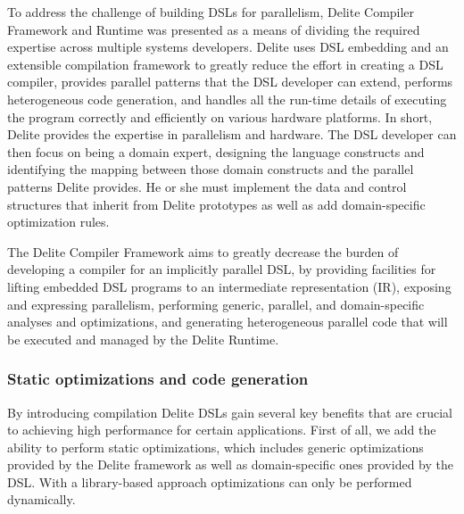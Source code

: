To address the challenge of building DSLs for parallelism,
 Delite Compiler Framework and Runtime was presented as
a means of dividing the required expertise across multiple
systems developers. Delite uses DSL embedding and an extensible compilation
 framework to greatly reduce the effort
in creating a DSL compiler, provides parallel patterns that
the DSL developer can extend, performs heterogeneous code
generation, and handles all the run-time details of executing
the program correctly and efficiently on various hardware
platforms. In short, Delite provides the expertise in parallelism
and hardware. The DSL developer can then focus on being a
domain expert, designing the language constructs and identifying the mapping 
between those domain constructs and the
parallel patterns Delite provides. He or she must implement the
data and control structures that inherit from Delite prototypes
as well as add domain-specific optimization rules.

The Delite Compiler Framework aims to greatly decrease
the burden of developing a compiler for an implicitly parallel DSL, 
by providing facilities for lifting embedded DSL
programs to an intermediate representation (IR), exposing
and expressing parallelism, performing generic, parallel, and
domain-specific analyses and optimizations, and generating
heterogeneous parallel code that will be executed and managed
by the Delite Runtime.



\subsubsection{Static optimizations and code generation}

By introducing compilation Delite DSLs gain several key
benefits that are crucial to achieving high performance for
certain applications. First of all, we add the ability to perform
static optimizations, which includes generic optimizations provided by the 
Delite framework as well as domain-specific
ones provided by the DSL. With
a library-based approach optimizations can only be performed
dynamically.

